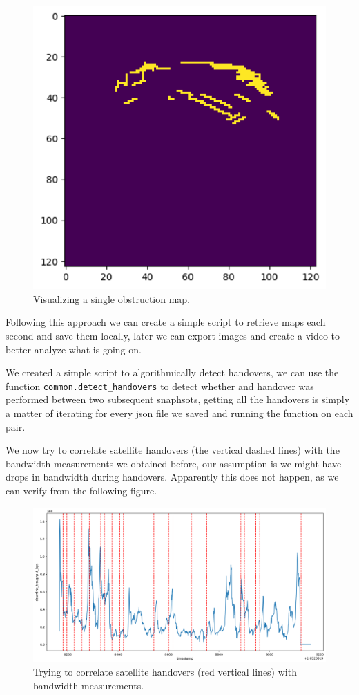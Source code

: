 \documentclass[IN,11pt,twoside,openright,bachelor,english]{tumthesis}
\begin{document}
\begin{figure}
	\label{fig:vis-single-map}
	\centering
	\includegraphics[width=0.5\columnwidth]{img/single_map.png}
	\caption{Visualizing a single obstruction map.}
\end{figure}


Following this approach we can create a simple script to retrieve maps each second and save them locally, later we can export images and create a video to better analyze what is going on. 

We created a simple script to algorithmically detect handovers, we can use the function \texttt{common.detect\_handovers} to detect whether and handover was performed between two subsequent snaphsots, getting all the handovers is simply a matter of iterating for every json file we saved and running the function on each pair.

We now try to correlate satellite handovers (the vertical dashed lines) with the bandwidth measurements we obtained before, our assumption is we might have drops in bandwidth during handovers. Apparently this does not happen, as we can verify from the following figure.


\begin{figure}
	\label{fig:vis-correlation-handovers}
	\centering
	\includegraphics[width=1\columnwidth]{img/correlation_handovers_bw.png}
	\caption{Trying to correlate satellite handovers (red vertical lines) with bandwidth measurements.}
\end{figure}
\end{document}
